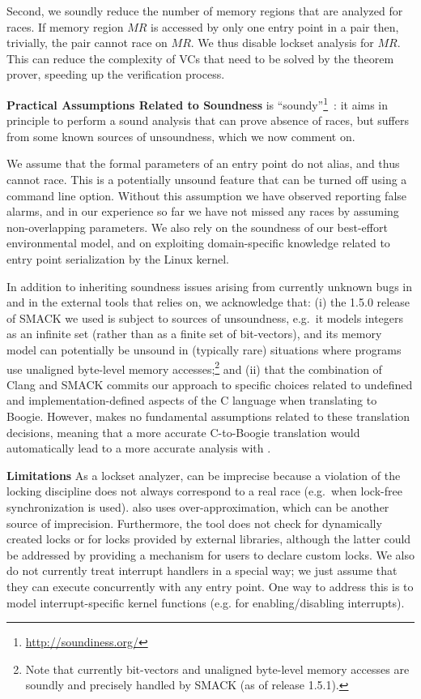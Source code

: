 Second, we soundly reduce the number of memory regions that are analyzed for races.  If memory region $\mathit{MR}$ is accessed by only one entry point in a pair then, trivially, the pair cannot race on $\mathit{MR}$.  We thus disable lockset analysis for $\mathit{MR}$.  This can reduce the complexity of VCs that need to be solved by the theorem prover, speeding up the verification process.

\noindent\textbf{Practical Assumptions Related to Soundness}
%
\whoop is ``soundy''\footnote{\url{http://soundiness.org/}}~\cite{soundiness}: it aims in principle to perform a sound analysis that can prove absence of races, but suffers from some known sources of unsoundness, which we now comment on.

We assume that the formal parameters of an entry point do not alias, and thus cannot race. This is a potentially unsound feature that can be turned off using a command line option.  Without this assumption we have observed \whoop reporting false alarms, and in our experience so far we have not missed any races by assuming non-overlapping parameters.  We also rely on the soundness of our best-effort environmental model, and on exploiting domain-specific knowledge related to entry point serialization by the Linux kernel.

In addition to inheriting soundness issues arising from currently unknown bugs in \whoop and in the external tools that \whoop relies on, we acknowledge that: (i) the 1.5.0 release of SMACK we used is subject to sources of unsoundness, e.g.\ it models integers as an infinite set (rather than as a finite set of bit-vectors), and its memory model can potentially be unsound in (typically rare) situations where programs use unaligned byte-level memory accesses;\footnote{Note that currently bit-vectors and unaligned byte-level memory accesses are soundly and precisely handled by SMACK (as of release 1.5.1).} and (ii) that the combination of Clang and SMACK commits our approach to specific choices related to undefined and implementation-defined aspects of the C language when translating to Boogie.  However, \whoop makes no fundamental assumptions related to these translation decisions, meaning that a more accurate C-to-Boogie translation would automatically lead to a more accurate analysis with \whoop.

\noindent\textbf{Limitations }
%
As a lockset analyzer, \whoop can be imprecise because a violation of the locking discipline does not always correspond to a real race (e.g.\ when lock-free synchronization is used). \whoop also uses over-approximation, which can be another source of imprecision. Furthermore, the tool does not check for dynamically created locks or for locks provided by external libraries, although the latter could be addressed by providing a mechanism for users to declare custom locks. We also do not currently treat interrupt handlers in a special way; we just assume that they can execute concurrently with any entry point. One way to address this is to model interrupt-specific kernel functions (e.g. for enabling/disabling interrupts).

